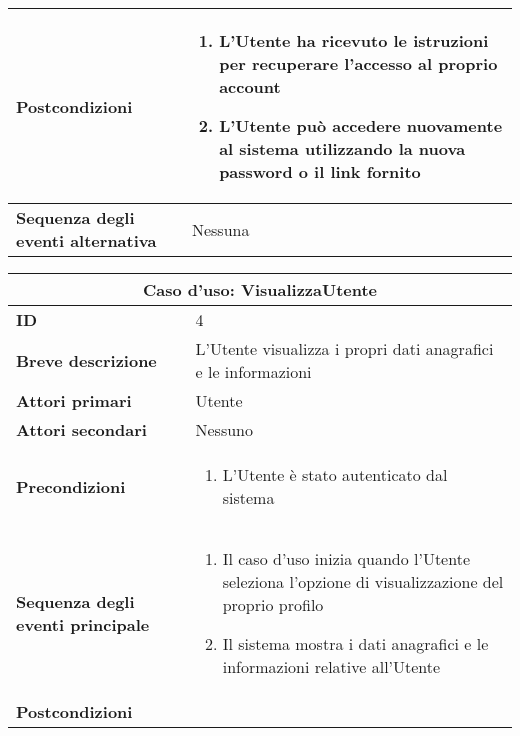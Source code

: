 \documentclass[a4paper]{report}
\begin{document}
\begin{table}[H]
\begin{tabular}{|p{3.9cm}|p{9.9cm}|}
\textbf{Postcondizioni} & \begin{enumerate}[leftmargin=14pt,label=\arabic*.,labelsep=0.5em,topsep=0pt,partopsep=0pt,parsep=0pt,itemsep=0pt]
    \item L’Utente ha ricevuto le istruzioni per recuperare l’accesso al proprio account
    \item L’Utente può accedere nuovamente al sistema utilizzando la nuova password o il link fornito
    \end{enumerate} \\ \hline
\textbf{Sequenza degli eventi alternativa} & Nessuna \\ \hline
\end{tabular}
\end{table}

\clearpage
\begin{table}[H]
\vspace*{-0cm}
\renewcommand{\arraystretch}{1.9}
\begin{tabular}{|p{3.9cm}|p{9.9cm}|}
\hline
\multicolumn{2}{|c|}{\textbf{Caso d’uso: VisualizzaUtente}} \\ \hline
\textbf{ID} & 4 \\ \hline
\textbf{Breve descrizione} & L’Utente visualizza i propri dati anagrafici e le informazioni \\ \hline
\textbf{Attori primari} & Utente \\ \hline
\textbf{Attori secondari} & Nessuno \\ \hline
\textbf{Precondizioni} & \begin{enumerate}[leftmargin=14pt,label=\arabic*.,labelsep=0.5em,topsep=0pt,partopsep=0pt,parsep=0pt,itemsep=0pt]
    \item L’Utente è stato autenticato dal sistema
\end{enumerate} \\ \hline
\textbf{Sequenza degli eventi principale} &
\begin{enumerate}[leftmargin=14pt,label=\arabic*.,labelsep=0.5em,topsep=0pt,partopsep=0pt,parsep=0pt,itemsep=0pt]
    \item Il caso d'uso inizia quando l'Utente seleziona l'opzione di visualizzazione del proprio profilo
    \item Il sistema mostra i dati anagrafici  e le informazioni relative all’Utente
\end{enumerate}\\ \hline
\textbf{Postcondizioni} & \begin{enumerate}[leftmargin=14pt,label=\arabic*.,labelsep=0.5em,topsep=0pt,partopsep=0pt,parsep=0pt,itemsep=0pt]

\end{enumerate}
\end{tabular}
\end{table}
\end{document}
